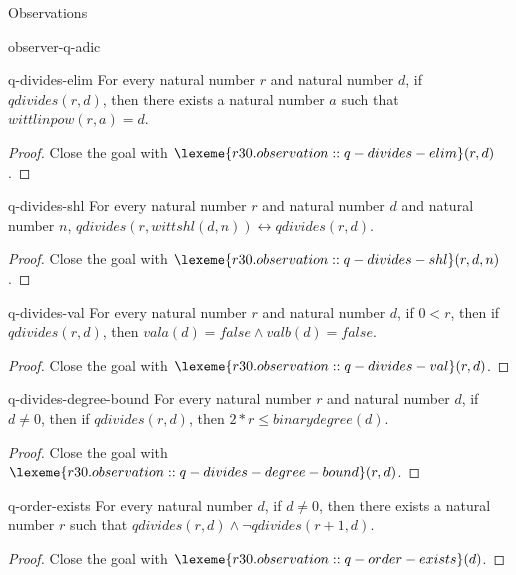 \begin{lexlean}{Observations}
\begin{section}{observer-q-adic}
\begin{theorem}{q-divides-elim}
For every natural number \(r\) and natural number \(d\), if \(qdivides(r, d)\), then there exists a natural number \(a\) such that \(wittlinpow(r, a) = d\).
\begin{proof}
Close the goal with \(\lexeme{r30.observation::q-divides-elim}(r, d)\).
\end{proof}
\end{theorem}

\begin{theorem}{q-divides-shl}
For every natural number \(r\) and natural number \(d\) and natural number \(n\), \(qdivides(r, wittshl(d, n)) ↔ qdivides(r, d)\).
\begin{proof}
Close the goal with \(\lexeme{r30.observation::q-divides-shl}(r, d, n)\).
\end{proof}
\end{theorem}

\begin{theorem}{q-divides-val}
For every natural number \(r\) and natural number \(d\), if \(0 < r\), then if \(qdivides(r, d)\), then \(vala(d) = false ∧ valb(d) = false\).
\begin{proof}
Close the goal with \(\lexeme{r30.observation::q-divides-val}(r, d)\).
\end{proof}
\end{theorem}

\begin{theorem}{q-divides-degree-bound}
For every natural number \(r\) and natural number \(d\), if \(d ≠ 0\), then if \(qdivides(r, d)\), then \(2 * r ≤ binarydegree(d)\).
\begin{proof}
Close the goal with \(\lexeme{r30.observation::q-divides-degree-bound}(r, d)\).
\end{proof}
\end{theorem}

\begin{theorem}{q-order-exists}
For every natural number \(d\), if \(d ≠ 0\), then there exists a natural number \(r\) such that \(qdivides(r, d) ∧ ¬ qdivides(r + 1, d)\).
\begin{proof}
Close the goal with \(\lexeme{r30.observation::q-order-exists}(d)\).
\end{proof}
\end{theorem}


\end{section}
\end{lexlean}

